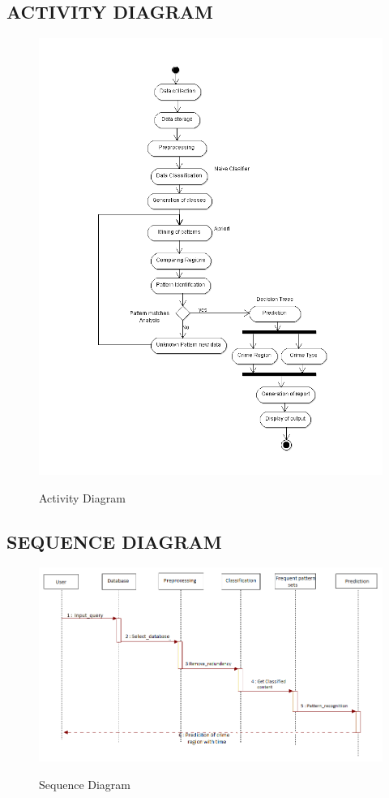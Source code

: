     \subsection*{ACTIVITY DIAGRAM}
    \begin{figure}[H]
  \centering
  \includegraphics[scale=0.75]{ACTIVITYDIAGCRIME.png}\\
  \caption{Activity Diagram}
  
\end{figure}
    
   \pagebreak 
    \subsection*{SEQUENCE DIAGRAM}
    
    \begin{figure}[H]
  \centering
  \includegraphics[scale=0.65]{SEQU.png}\\
  \caption{Sequence Diagram}
  
\end{figure}
 \pagebreak   
